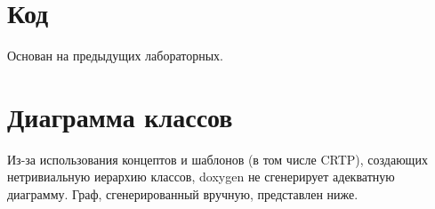 \documentclass[russian, english]{article}
\begin{document}
\newpage
\appendix
\section{Код}
Основан на предыдущих лабораторных.

\section{Диаграмма классов}
Из-за использования концептов и шаблонов (в том числе CRTP), создающих нетривиальную иерархию классов, doxygen не сгенерирует адекватную диаграмму. Граф, сгенерированный вручную, представлен ниже. \\
\noindent{}
%
\end{document}

